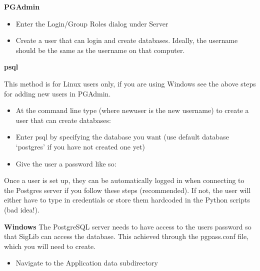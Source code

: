\documentclass[letterpaper,10pt,openany,oneside]{sphinxmanual}
\begin{document}
\textbf{PGAdmin}
\begin{itemize}
\item {} 
Enter the Login/Group Roles dialog under Server

\item {} 
Create a user that can login and create databases. Ideally, the
username should be the same as the username on that computer.

\end{itemize}

\begin{DUlineblock}{0em}
\item[] \textbf{psql}
\item[] This method is for Linux users only, if you are using Windows see the
above steps for adding new users in PGAdmin.
\end{DUlineblock}
\begin{itemize}
\item {} 
At the command line type (where newuser is the new username) to
create a user that can create databases:

\end{itemize}

\begin{itemize}
\item {} 
Enter psql by specifying the database you want (use default database
`postgres' if you have not created one yet)

\end{itemize}

\begin{itemize}
\item {} 
Give the user a password like so:

\end{itemize}


Once a user is set up, they can be automatically logged in when
connecting to the Postgres server if you follow these steps
(recommended). If not, the user will either have to type in credentials
or store them hardcoded in the Python scripts (bad idea!).

\textbf{Windows} The PostgreSQL server needs to have access to the users
password so that SigLib can access the database. This achieved through
the pgpass.conf file, which you will need to create.
\begin{itemize}
\item {} 
Navigate to the Application data subdirectory

\end{itemize}
\end{document}

